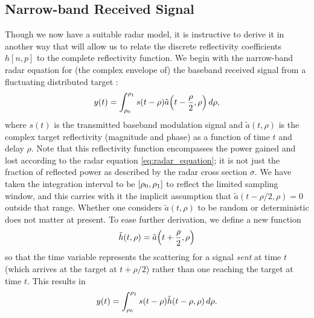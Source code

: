 \subsection{Narrow-band Received Signal}
Though we now have a suitable radar model, it is instructive to derive it in another way that will allow us to relate the discrete reflectivity coefficients $h[n,p]$ to the complete reflectivity function. We begin with the narrow-band radar equation for (the complex envelope of) the baseband received signal from a fluctuating distributed target \autocite{VTre01}:
\begin{equation}
 y(t) = \int_{\rho_0}^{\rho_1} s(t - \rho) \tilde{a}\paren*{t - \frac{\rho}{2}, \rho} \dee\rho,
\end{equation}
where $s(t)$ is the transmitted baseband modulation signal and $\tilde{a}(t, \rho)$ is the complex target reflectivity (magnitude and phase) as a function of time $t$ and delay $\rho$. Note that this reflectivity function encompasses the power gained and lost according to the radar equation \eqref{eq:radar_equation}; it is not just the fraction of reflected power as described by the radar cross section $\sigma$. We have taken the integration interval to be $\brak*{\rho_0, \rho_1}$ to reflect the limited sampling window, and this carries with it the implicit assumption that $\tilde{a}(t - \rho/2, \rho) = 0$ outside that range. Whether one considers $\tilde{a}(t, \rho)$ to be random or deterministic does not matter at present. To ease further derivation, we define a new function
\begin{equation}
 \tilde{h}(t, \rho) = \tilde{a}\paren*{t + \frac{\rho}{2}, \rho}
\end{equation}
so that the time variable represents the scattering for a signal \emph{sent} at time $t$ (which arrives at the target at $t + \rho/2$) rather than one reaching the target at time $t$. This results in
\begin{equation}\label{eq:continuous_measurement}
 y(t) = \int_{\rho_0}^{\rho_1} s(t - \rho) \tilde{h}(t - \rho, \rho) \dee\rho.
\end{equation}

